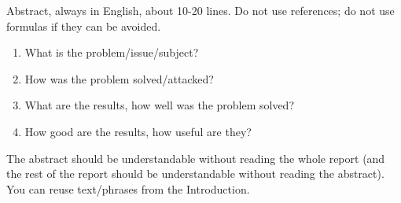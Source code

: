 Abstract, always in English, about 10-20 lines. Do not use references; do not use formulas if they can be avoided.
\begin{enumerate}
\item What is the problem/issue/subject?
\item How was the problem solved/attacked?
\item What are the results, how well was the problem solved?
\item How good are the results, how useful are they?
\end{enumerate}
The abstract should be understandable without reading the whole report (and the rest of the report should be understandable without reading the abstract). You can reuse text/phrases from the Introduction.


